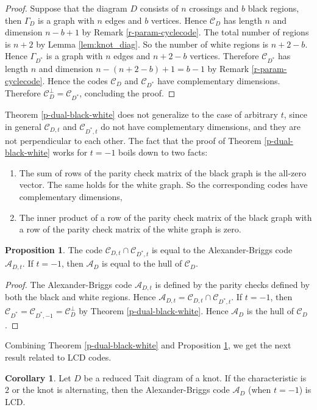\documentclass[11pt,a4paper]{article}
\theoremstyle{definition}
\newtheorem{corollary}[theorem]{Corollary}
\newtheorem{proposition}[theorem]{Proposition}
\newcommand{\mA}{\mathcal{A}}
\newcommand{\mC}{\mathcal{C}}
\begin{document}
\begin{proof}
 Suppose that the diagram $D$ consists of $n$ crossings and $b$ black regions, then $\Gamma_D$ is a graph with $n$ edges and $b$ vertices.
 Hence $\mC_D $ has length $n$ and dimension $n-b+1$ by Remark \ref{r-param-cyclecode}. 
 The total number of regions is $n+2$ by Lemma \ref{lem:knot_diag}. So the number of white regions is $n+2-b$.
 Hence $\Gamma_{D^*}$ is a graph with $n$ edges and $n+2-b$ vertices. 
 Therefore $\mC_{D^*}$ has length $n$ and dimension $n-(n+2-b)+1=b-1$ by Remark \ref{r-param-cyclecode}. 
 Hence the codes $\mC_D$ and $\mC_{D^*}$ have complementary dimensions. Therefore $\mC_D^\perp =\mC_{D^*}$, concluding the proof.
 \end{proof}

Theorem \ref{p-dual-black-white} does not generalize to the case of arbitrary $t$, since in general $\mC_{D,t}$ and $\mC_{D^*,t}$ do not have complementary dimensions, and they are not perpendicular to each other. The fact that the proof of Theorem \ref{p-dual-black-white}  works for $t=-1$ boils down to two facts:
\begin{enumerate}
    \item The sum of rows of the parity check matrix of the black graph is the all-zero vector. The same holds for the white graph. So the corresponding codes have complementary dimensions,
    \item The inner product of a row of the parity check matrix of the black graph with a row of the parity check matrix of the white graph is zero.
\end{enumerate}


\begin{proposition}\label{p-AB-hull}
 The code $\mC_{D,t} \cap \mC_{D^*,t}$ is equal to the Alexander-Briggs code $\mA_{D,t}$. 
 If $t=-1$, then $\mA_{D}$ is equal to the hull of $\mC_{D}$.
 \end{proposition}

\begin{proof}
The Alexander-Briggs code $\mA_{D,t}$ is defined by the parity checks defined by both the black and white regions.
Hence $\mA_{D,t}=\mC_{D,t} \cap \mC_{D^*,t}$. If $t=-1$, then $\mC_{D^*}= \mC_{D^*,-1}=\mC_{D}^\perp $ by Theorem \ref{p-dual-black-white}.
Hence $\mA_{D}$ is the hull of $\mC_{D}$.
\end{proof}

Combining Theorem \ref{p-dual-black-white} and Proposition \ref{p-AB-hull}, we get the next result related to LCD codes.


\begin{corollary}
\label{c-dual}
Let $D$ be a reduced Tait diagram of a knot.
If the characteristic is $2$ or the knot is alternating, then the Alexander-Briggs code $\mA_{D}$ (when $t=-1$) is LCD.
\end{corollary} 
\end{document}
